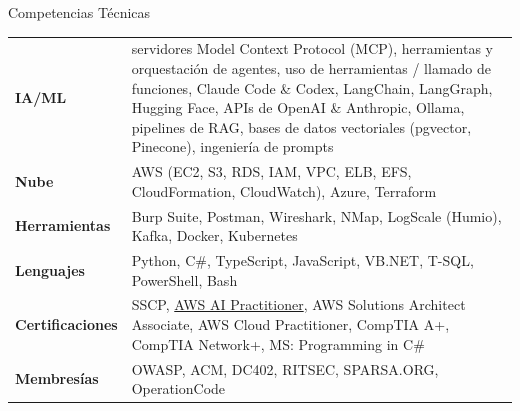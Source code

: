 \documentclass{resume} %
\begin{document}
\begin{rSection}{Competencias T\'ecnicas}

\begin{tabular}{ @{} >{\bfseries}l @{\hspace{6ex}} p{4.5in} }
IA/ML & servidores Model Context Protocol (MCP), herramientas y orquestaci\'on de agentes, uso de herramientas / llamado de funciones, Claude Code \& Codex, LangChain, LangGraph, Hugging Face, APIs de OpenAI \& Anthropic, Ollama, pipelines de RAG, bases de datos vectoriales (pgvector, Pinecone), ingenier\'ia de prompts\\
Nube & AWS (EC2, S3, RDS, IAM, VPC, ELB, EFS, CloudFormation, CloudWatch), Azure, Terraform\\
Herramientas & Burp Suite, Postman, Wireshark, NMap, LogScale (Humio), Kafka, Docker, Kubernetes\\
Lenguajes & Python, C\#, TypeScript, JavaScript, VB.NET, T-SQL, PowerShell, Bash\\
Certificaciones & SSCP, \href{https://www.credly.com/badges/6eda0d26-3542-4f75-b1e5-6d481e701bf1}{AWS AI Practitioner}, AWS Solutions Architect Associate, AWS Cloud Practitioner, CompTIA A+, CompTIA Network+, MS: Programming in C\#\\
Membres\'ias & OWASP, ACM, DC402, RITSEC, SPARSA.ORG, OperationCode
\end{tabular}

\end{rSection}


\end{document}
